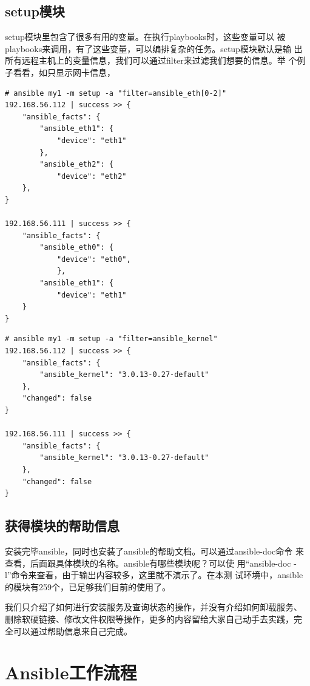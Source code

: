 \subsection{setup模块}
\label{AnsibleSetupMod}

setup模块里包含了很多有用的变量。在执行playbooks时，这些变量可以
被playbooks来调用，有了这些变量，可以编排复杂的任务。setup模块默认是输
出所有远程主机上的变量信息，我们可以通过filter来过滤我们想要的信息。举
个例子看看，如只显示网卡信息，
\begin{verbatim}
# ansible my1 -m setup -a "filter=ansible_eth[0-2]"
192.168.56.112 | success >> {
    "ansible_facts": {
        "ansible_eth1": {
            "device": "eth1"
        }, 
        "ansible_eth2": {
            "device": "eth2"
    },
}

192.168.56.111 | success >> {
    "ansible_facts": {
        "ansible_eth0": {
            "device": "eth0", 
            }, 
        "ansible_eth1": {
            "device": "eth1"
    }
}
\end{verbatim}

\begin{verbatim}
# ansible my1 -m setup -a "filter=ansible_kernel"
192.168.56.112 | success >> {
    "ansible_facts": {
        "ansible_kernel": "3.0.13-0.27-default"
    }, 
    "changed": false
}

192.168.56.111 | success >> {
    "ansible_facts": {
        "ansible_kernel": "3.0.13-0.27-default"
    }, 
    "changed": false
}
\end{verbatim}

\subsection{获得模块的帮助信息}
\label{sec:AnsibleGetModHelp}

安装完毕ansible，同时也安装了ansible的帮助文档。可以通过ansible-doc命令
来查看，后面跟具体模块的名称。ansible有哪些模块呢？可以使
用“ansible-doc -l”命令来查看，由于输出内容较多，这里就不演示了。在本测
试环境中，ansible的模块有259个，已足够我们目前的使用了。

我们只介绍了如何进行安装服务及查询状态的操作，并没有介绍如何卸载服务、
删除软硬链接、修改文件权限等操作，更多的内容留给大家自己动手去实践，完
全可以通过帮助信息来自己完成。

\section{Ansible工作流程}
\label{sec:AnsibleWorkflow}

